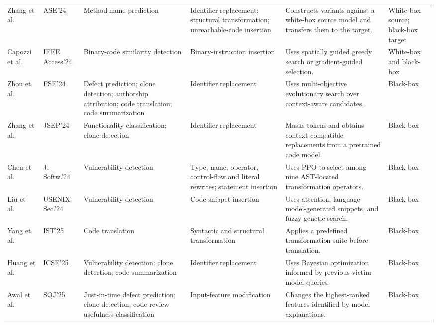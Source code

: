 \documentclass[acmsmall,screen,review,nonacm]{acmart}
\begin{document}
{\begin{longtable}{@{}L{2.1cm}L{1.5cm}L{2.30cm}L{2.50cm}L{3.50cm}L{1.35cm}@{}}
Zhang et al.~\cite{transfer2024coding} &
ASE'24 &
Method-name prediction &
Identifier replacement; structural transformation; unreachable-code insertion &
Constructs variants against a white-box source model and transfers them to the target. &
White-box source; black-box target \\

Capozzi et al.~\cite{spatialgreedy2024} &
IEEE Access'24 &
Binary-code similarity detection &
Binary-instruction insertion &
Uses spatially guided greedy search or gradient-guided selection. &
White-box and black-box \\

Zhou et al.~\cite{moaa2024} &
FSE'24 &
Defect prediction; clone detection; authorship attribution; code translation; code summarization &
Identifier replacement &
Uses multi-objective evolutionary search over context-aware candidates. &
Black-box \\

Zhang et al.~\cite{codebertattack2024} &
JSEP'24 &
Functionality classification; clone detection &
Identifier replacement &
Masks tokens and obtains context-compatible replacements from a pretrained code model. &
Black-box \\

Chen et al.~\cite{rlattack2024} & J. Softw.'24 & Vulnerability detection & Type, name, operator, control-flow and literal rewrites; statement insertion & Uses PPO to select among nine AST-located transformation operators. & Black-box \\

Liu et al.~\cite{liu2024eatvul} &
USENIX Sec.'24 &
Vulnerability detection &
Code-snippet insertion &
Uses attention, language-model-generated snippets, and fuzzy genetic search. &
Black-box \\

Yang et al.~\cite{yang2025cotr} &
IST'25 &
Code translation &
Syntactic and structural transformation &
Applies a predefined transformation suite before translation. &
Black-box \\

Huang et al.~\cite{huang2025iterative} &
ICSE'25 &
Vulnerability detection; clone detection; code summarization &
Identifier replacement &
Uses Bayesian optimization informed by previous victim-model queries. &
Black-box \\

Awal et al.~\cite{explainability2025} &
SQJ'25 &
Just-in-time defect prediction; clone detection; code-review usefulness classification &
Input-feature modification &
Changes the highest-ranked features identified by model explanations. &
Black-box \\


\end{longtable}}
\end{document}
